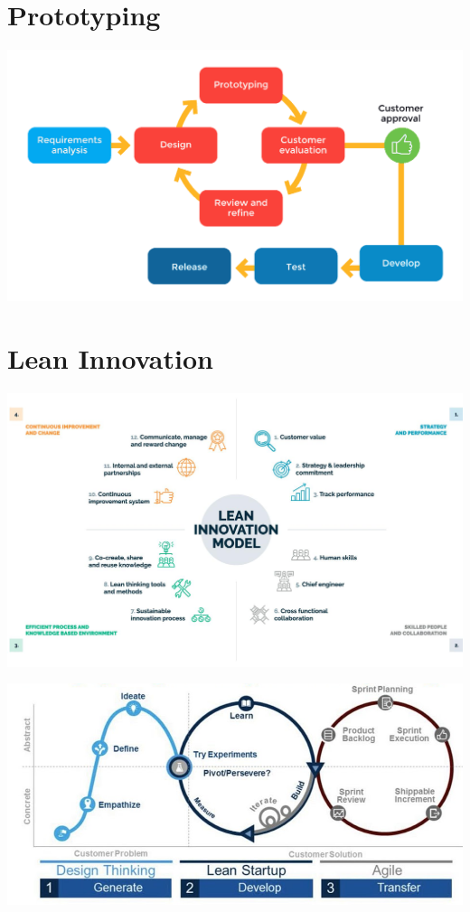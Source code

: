 \documentclass{article}[18pt]
\begin{document}
\section{Prototyping}
\begin{center}
	\includegraphics[scale=0.7]{Prototyping}
\end{center}
\section{Lean Innovation}
\begin{center}
	\includegraphics[scale=0.4]{Lean-Innovation}
\end{center}
\begin{center}
	\includegraphics[scale=0.7]{Lean}
\end{center}
\end{document}
